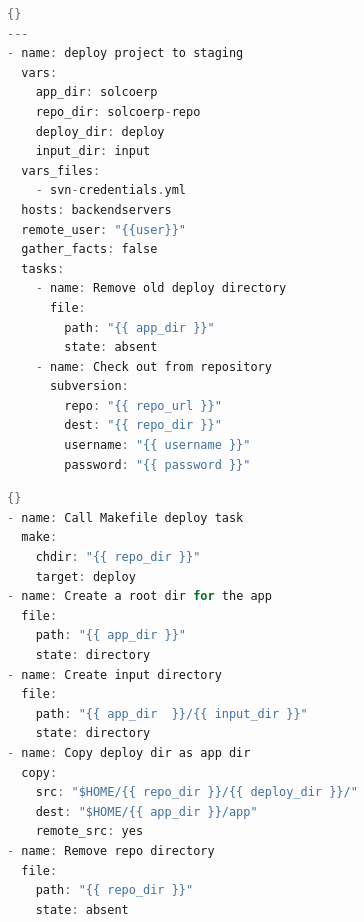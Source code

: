 \noindent\begin{minipage}{.45\textwidth}
	\begin{lstlisting}[language=C,caption={Playbook parte 1},label={lst:script-ansible-1}]{}
---
- name: deploy project to staging
  vars:
    app_dir: solcoerp
    repo_dir: solcoerp-repo
    deploy_dir: deploy
    input_dir: input
  vars_files:
    - svn-credentials.yml
  hosts: backendservers
  remote_user: "{{user}}"
  gather_facts: false
  tasks:
    - name: Remove old deploy directory
      file:
        path: "{{ app_dir }}"
        state: absent
    - name: Check out from repository
      subversion: 
        repo: "{{ repo_url }}"
        dest: "{{ repo_dir }}"
        username: "{{ username }}"
        password: "{{ password }}"
	\end{lstlisting}
\end{minipage}\hfill
\begin{minipage}{.45\textwidth}
	\begin{lstlisting}[language=C,caption={Playbook parte 2},label=lst:script-ansible-2]{}
- name: Call Makefile deploy task
  make:
    chdir: "{{ repo_dir }}"
    target: deploy
- name: Create a root dir for the app 
  file:
    path: "{{ app_dir }}"
    state: directory
- name: Create input directory
  file:
    path: "{{ app_dir  }}/{{ input_dir }}"
    state: directory
- name: Copy deploy dir as app dir 
  copy:
    src: "$HOME/{{ repo_dir }}/{{ deploy_dir }}/"
    dest: "$HOME/{{ app_dir }}/app"
    remote_src: yes 
- name: Remove repo directory
  file:
    path: "{{ repo_dir }}"
    state: absent
	\end{lstlisting}
\end{minipage}


